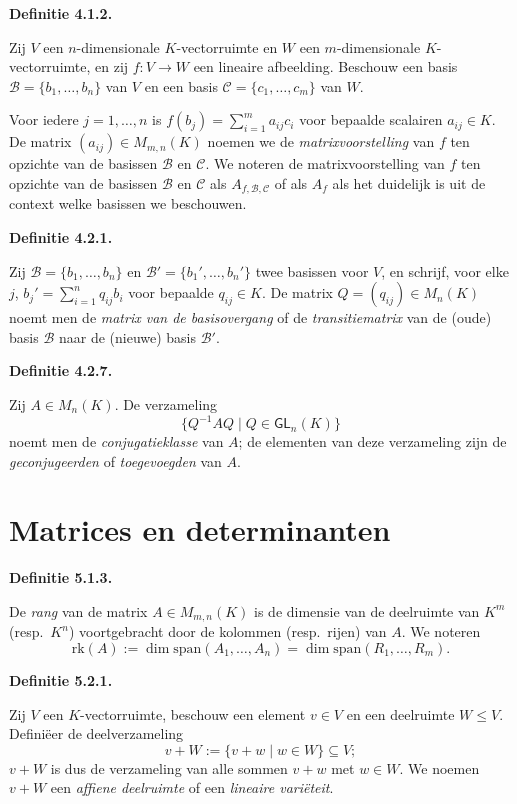 \documentclass[10pt,a4paper]{article}
\newenvironment{res}[1]{%
  \par\noindent\textbf{Definitie #1.}~\ignorespaces
}{%
  \par\vspace{2pt}\normalfont
}
\begin{document}
\begin{res}{4.1.2}
Zij $V$ een $n$-dimensionale $K$-vectorruimte en $W$ een $m$-dimensionale $K$-vectorruimte, en zij $f:V\to W$ een lineaire afbeelding. Beschouw een basis $\mathcal B=\{b_1,\dots,b_n\}$ van $V$ en een basis $\mathcal C=\{c_1,\dots,c_m\}$ van $W$.

Voor iedere $j=1,\dots,n$ is $f(b_j)=\sum_{i=1}^m a_{ij}c_i$ voor bepaalde scalairen $a_{ij}\in K$. De matrix $(a_{ij})\in M_{m,n}(K)$ noemen we de \textit{matrixvoorstelling} van $f$ ten opzichte van de basissen $\mathcal B$ en $\mathcal C$. We noteren de matrixvoorstelling van $f$ ten opzichte van de basissen $\mathcal B$ en $\mathcal C$ als $A_{f,\mathcal B,\mathcal C}$ of als $A_f$ als het duidelijk is uit de context welke basissen we beschouwen.
\end{res}

\begin{res}{4.2.1}
Zij $\mathcal B=\{b_1,\dots,b_n\}$ en $\mathcal B'=\{b_1',\dots,b_n'\}$ twee basissen voor $V$, en schrijf, voor elke $j$, $b_j'=\sum_{i=1}^n q_{ij}b_i$ voor bepaalde $q_{ij}\in K$. De matrix $Q=(q_{ij})\in M_n(K)$ noemt men de \textit{matrix van de basisovergang} of de \textit{transitiematrix} van de (oude) basis $\mathcal B$ naar de (nieuwe) basis $\mathcal B'$.
\end{res}

\begin{res}{4.2.7}
Zij $A\in M_n(K)$. De verzameling
\[
\{Q^{-1}AQ \mid Q\in \mathsf{GL}_n(K)\}
\]
noemt men de \textit{conjugatieklasse} van $A$; de elementen van deze verzameling zijn de \textit{geconjugeerden} of \textit{toegevoegden} van $A$.
\end{res}

\section{Matrices en determinanten}

\begin{res}{5.1.3}
De \textit{rang} van de matrix $A\in M_{m,n}(K)$ is de dimensie van de deelruimte van $K^m$ (resp.\ $K^n$) voortgebracht door de kolommen (resp.\ rijen) van $A$. We noteren
\[
\mathrm{rk}(A):=\dim\mathrm{span}(A_1,\dots,A_n)=\dim\mathrm{span}(R_1,\dots,R_m).
\]
\end{res}

\begin{res}{5.2.1}
Zij $V$ een $K$-vectorruimte, beschouw een element $v\in V$ en een deelruimte $W\le V$. Defini\"eer de deelverzameling
\[
v+W:=\{v+w\mid w\in W\}\subseteq V;
\]
$v+W$ is dus de verzameling van alle sommen $v+w$ met $w\in W$. We noemen $v+W$ een \textit{affiene deelruimte} of een \textit{lineaire vari\"eteit}.
\end{res}
\end{document}
